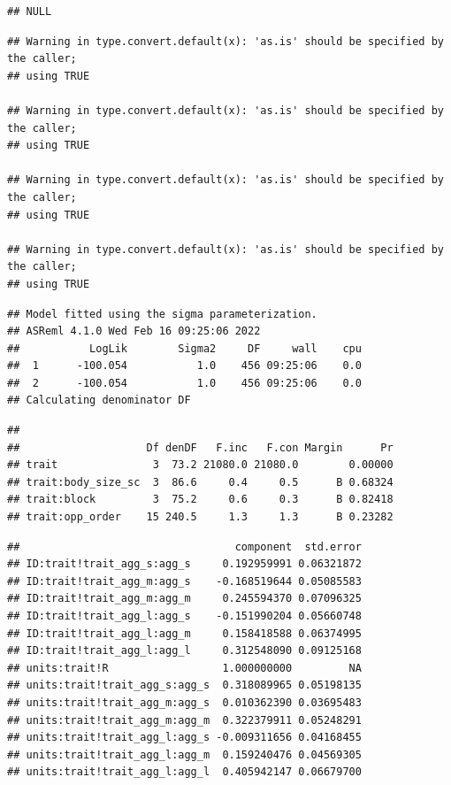 \documentclass[
  12pt,
]{book}
\newenvironment{Shaded}{\begin{snugshade}}{\end{snugshade}}
\newcommand{\KeywordTok}[1]{\textcolor[rgb]{0.13,0.29,0.53}{\textbf{#1}}}
\newcommand{\NormalTok}[1]{#1}
\newcommand{\OperatorTok}[1]{\textcolor[rgb]{0.81,0.36,0.00}{\textbf{#1}}}
\newcommand{\StringTok}[1]{\textcolor[rgb]{0.31,0.60,0.02}{#1}}
\begin{document}
\begin{verbatim}
## NULL
\end{verbatim}

\begin{verbatim}
## Warning in type.convert.default(x): 'as.is' should be specified by the caller;
## using TRUE

## Warning in type.convert.default(x): 'as.is' should be specified by the caller;
## using TRUE

## Warning in type.convert.default(x): 'as.is' should be specified by the caller;
## using TRUE

## Warning in type.convert.default(x): 'as.is' should be specified by the caller;
## using TRUE
\end{verbatim}

\begin{verbatim}
## Model fitted using the sigma parameterization.
## ASReml 4.1.0 Wed Feb 16 09:25:06 2022
##           LogLik        Sigma2     DF     wall    cpu
##  1      -100.054           1.0    456 09:25:06    0.0
##  2      -100.054           1.0    456 09:25:06    0.0
## Calculating denominator DF
\end{verbatim}

\begin{verbatim}
## 
##                    Df denDF   F.inc   F.con Margin      Pr
## trait               3  73.2 21080.0 21080.0        0.00000
## trait:body_size_sc  3  86.6     0.4     0.5      B 0.68324
## trait:block         3  75.2     0.6     0.3      B 0.82418
## trait:opp_order    15 240.5     1.3     1.3      B 0.23282
\end{verbatim}

\begin{Shaded}
\end{Shaded}

\begin{verbatim}
##                                  component  std.error
## ID:trait!trait_agg_s:agg_s     0.192959991 0.06321872
## ID:trait!trait_agg_m:agg_s    -0.168519644 0.05085583
## ID:trait!trait_agg_m:agg_m     0.245594370 0.07096325
## ID:trait!trait_agg_l:agg_s    -0.151990204 0.05660748
## ID:trait!trait_agg_l:agg_m     0.158418588 0.06374995
## ID:trait!trait_agg_l:agg_l     0.312548090 0.09125168
## units:trait!R                  1.000000000         NA
## units:trait!trait_agg_s:agg_s  0.318089965 0.05198135
## units:trait!trait_agg_m:agg_s  0.010362390 0.03695483
## units:trait!trait_agg_m:agg_m  0.322379911 0.05248291
## units:trait!trait_agg_l:agg_s -0.009311656 0.04168455
## units:trait!trait_agg_l:agg_m  0.159240476 0.04569305
## units:trait!trait_agg_l:agg_l  0.405942147 0.06679700
\end{verbatim}
\end{document}
